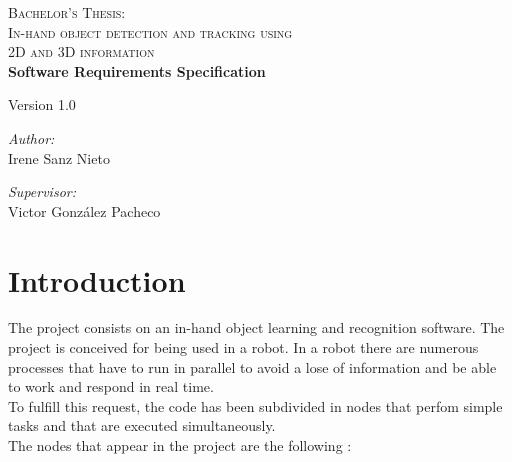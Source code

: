 \documentclass{article}
\begin{document}
\begin{titlepage}

\begin{center}
\textsc{\huge Bachelor's Thesis:\\[0.5cm]In-hand object detection and tracking using\\[0.5cm]2D and 3D
information }\\[4cm]


{\Huge\bfseries{Software Requirements Specification}\\[2cm]}

\Large{Version 1.0}
\\[11cm]


\begin{minipage}{0.55\textwidth}
\begin{flushleft} \large
\emph{Author:}\\
Irene Sanz Nieto\\
\end{flushleft}
\end{minipage}
\begin{minipage}{0.4\textwidth}
\begin{flushright} \large
\emph{Supervisor:}\\
Victor González Pacheco\end{flushright}\end{minipage}\vfill


\end{center}
\end{titlepage}

%
\newpage
%
\tableofcontents
\newpage


\section{Introduction}
\hspace{0.5cm}The project consists on an in-hand object learning and recognition software. 
The project is conceived for being used in a robot. In a robot there are numerous processes that have to run in parallel to avoid a lose of information and be able to work and respond in real time. 
\\
To fulfill this request, the code has been subdivided in nodes that perfom simple tasks and that are executed simultaneously. 
\\
The nodes that appear in the project are the following : 
\end{document}
